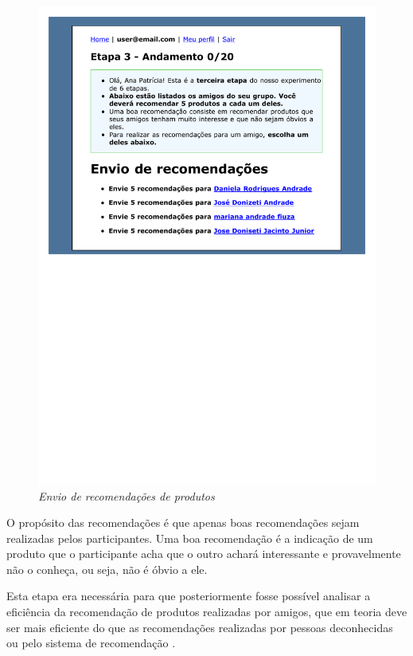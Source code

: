 \begin{figure}[htp]
  \centering
  \includegraphics[width=\textwidth]{imagens/stage-3}
  \caption{\it Envio de recomendações de produtos}
  \label{fig:stage-3}
\end{figure}

O propósito das recomendações é que apenas boas recomendações sejam realizadas pelos participantes. Uma boa recomendação é a indicação de um produto que o participante acha que o outro achará interessante e provavelmente não o conheça, ou seja, não é óbvio a ele.

Esta etapa era necessária para que posteriormente fosse possível analisar a eficiência da recomendação de produtos realizadas por amigos, que em teoria deve ser mais eficiente do que as recomendações realizadas por pessoas deconhecidas ou pelo sistema de recomendação \cite{bonhard2007devil}.

